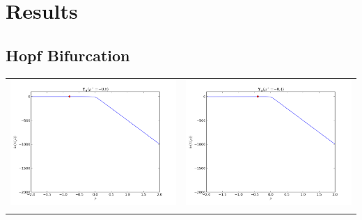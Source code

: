 \section{Results}
\subsection{Hopf Bifurcation}
\begin{table}[ht]
\centering
\begin{tabular}{cc}
\includegraphics[scale=0.3]{likelihood_hopf08m}&\includegraphics[scale=0.3]{likelihood_hopf04m}\\
\newline

\end{tabular}
\end{table}
